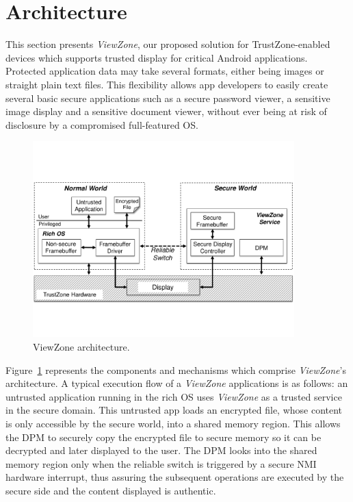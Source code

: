 
% 
% 
\section{Architecture}
\label{sec:architecture}

This section presents \emph{ViewZone}, our proposed solution for TrustZone-enabled devices which supports trusted display for critical Android applications. Protected application data may take several formats, either being images or straight plain text files. This flexibility allows app developers to easily create several basic secure applications such as a secure password viewer, a sensitive image display and a sensitive document viewer, without ever being at risk of disclosure by a compromised full-featured OS.

\begin{figure}[t!]
	\centering
	\includegraphics[width=0.9\textwidth]{img/viewzone_architecture.pdf}
	\caption{ViewZone architecture.}
	\label{fig:viewzone_architecture}
\end{figure}

Figure~\ref{fig:viewzone_architecture} represents the components and mechanisms which comprise \emph{ViewZone}'s architecture. A typical execution flow of a \emph{ViewZone} applications is as follows: an untrusted application running in the rich OS uses \emph{ViewZone} as a trusted service in the secure domain. This untrusted app loads an encrypted file, whose content is only accessible by the secure world, into a shared memory region. This allows the \ac{DPM} to securely copy the encrypted file to secure memory so it can be decrypted and later displayed to the user. The \ac{DPM} looks into the shared memory region only when the reliable switch is triggered by a secure \ac{NMI} hardware interrupt, thus assuring the subsequent operations are executed by the secure side and the content displayed is authentic.

